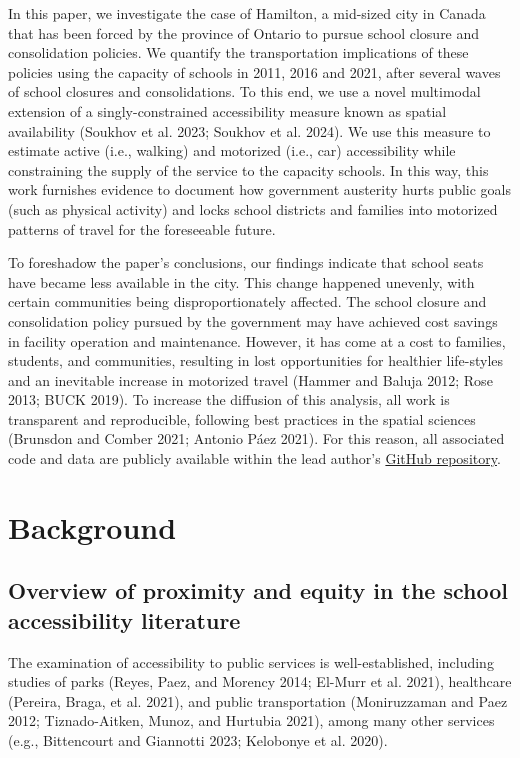 \documentclass[
default
]{sn-jnl}
\begin{document}
In this paper, we investigate the case of Hamilton, a mid-sized city in
Canada that has been forced by the province of Ontario to pursue school
closure and consolidation policies. We quantify the transportation
implications of these policies using the capacity of schools in 2011,
2016 and 2021, after several waves of school closures and
consolidations. To this end, we use a novel multimodal extension of a
singly-constrained accessibility measure known as spatial availability
(Soukhov et al. 2023; Soukhov et al. 2024). We use this measure to
estimate active (i.e., walking) and motorized (i.e., car) accessibility
while constraining the supply of the service to the capacity schools. In
this way, this work furnishes evidence to document how government
austerity hurts public goals (such as physical activity) and locks
school districts and families into motorized patterns of travel for the
foreseeable future.

To foreshadow the paper's conclusions, our findings indicate that school
seats have became less available in the city. This change happened
unevenly, with certain communities being disproportionately affected.
The school closure and consolidation policy pursued by the government
may have achieved cost savings in facility operation and maintenance.
However, it has come at a cost to families, students, and communities,
resulting in lost opportunities for healthier life-styles and an
inevitable increase in motorized travel (Hammer and Baluja 2012; Rose
2013; BUCK 2019). To increase the diffusion of this analysis, all work
is transparent and reproducible, following best practices in the spatial
sciences (Brunsdon and Comber 2021; Antonio Páez 2021). For this reason,
all associated code and data are publicly available within the lead
author's
\href{https://github.com/soukhova/School-closures-accessibility-impacts}{GitHub
repository}.

\section{Background}\label{background}

\subsection{Overview of proximity and equity in the school accessibility
literature}\label{overview-of-proximity-and-equity-in-the-school-accessibility-literature}

The examination of accessibility to public services is well-established,
including studies of parks (Reyes, Paez, and Morency 2014; El-Murr et
al. 2021), healthcare (Pereira, Braga, et al. 2021), and public
transportation (Moniruzzaman and Paez 2012; Tiznado-Aitken, Munoz, and
Hurtubia 2021), among many other services (e.g., Bittencourt and
Giannotti 2023; Kelobonye et al. 2020).
\end{document}
